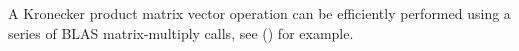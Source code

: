 A Kronecker product matrix vector operation can be efficiently performed using a series of BLAS matrix-multiply calls, see (\cite{buis1996efficient}) for example.











